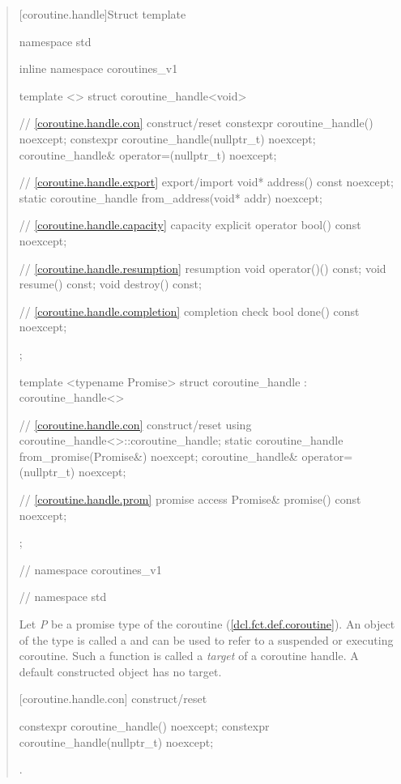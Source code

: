 \begin{quote}
[coroutine.handle]{Struct template }

%
\begin{codeblock}
namespace std {
  inline namespace coroutines_v1 {
    template <>
    struct coroutine_handle<void>
    {
      // \ref{coroutine.handle.con} construct/reset
      constexpr coroutine_handle() noexcept;		
      constexpr coroutine_handle(nullptr_t) noexcept;
      coroutine_handle& operator=(nullptr_t) noexcept;
      
      // \ref{coroutine.handle.export} export/import
      void* address() const noexcept;
      static coroutine_handle from_address(void* addr) noexcept;		
      
      // \ref{coroutine.handle.capacity} capacity
      explicit operator bool() const noexcept;
      
      // \ref{coroutine.handle.resumption} resumption
      void operator()() const;
      void resume() const;	
      void destroy() const;
      
      // \ref{coroutine.handle.completion} completion check
      bool done() const noexcept; 
    };
    
    template <typename Promise>
    struct coroutine_handle : coroutine_handle<>
    {
      // \ref{coroutine.handle.con} construct/reset
      using coroutine_handle<>::coroutine_handle;
      static coroutine_handle from_promise(Promise&) noexcept;		
      coroutine_handle& operator=(nullptr_t) noexcept;
      
      // \ref{coroutine.handle.prom} promise access
      Promise& promise() const noexcept;		
    };
  } // namespace coroutines_v1
} // namespace std
\end{codeblock}

\pnum
Let \textit{P} be a promise type of the coroutine (\ref{dcl.fct.def.coroutine}). An object of the type  is called a 
and can be used to refer to a suspended or executing coroutine.
Such a function is called a \textit{target} of a coroutine handle.
A default constructed  object has no target.


[coroutine.handle.con]{ construct/reset}
\begin{itemdecl}
  constexpr coroutine_handle() noexcept;		
  constexpr coroutine_handle(nullptr_t) noexcept;
\end{itemdecl}
\begin{itemdescr}
  \pnum\postconditions {}.
\end{itemdescr}


\end{quote}
